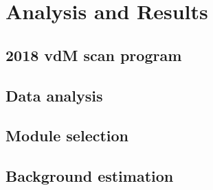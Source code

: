 \chapter{Analysis and Results}


\section{2018 vdM scan program}



\section{Data analysis}



\section{Module selection}


\section{Background estimation}







